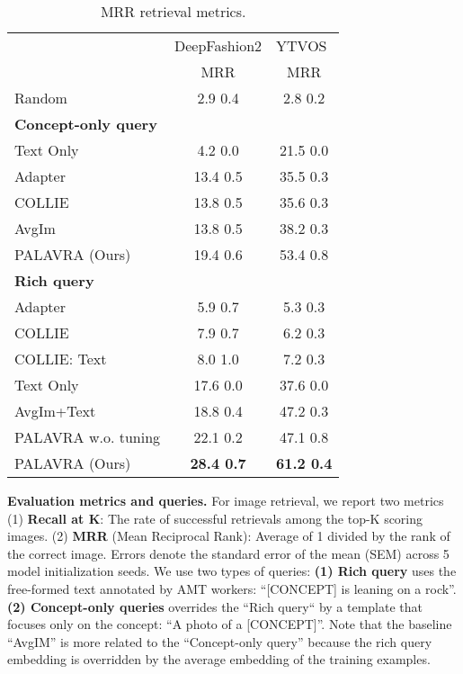 \documentclass[runningheads]{llncs}
\newcommand{\concept}{[CONCEPT]}
\begin{document}
\begin{table}[t]
\centering
    \begin{tabular}{l|c|c}

    \toprule
        {} &    \multicolumn{1}{l|}{DeepFashion2}       &    \multicolumn{1}{l}{YTVOS} \\
    {} &         MRR &         MRR \\
    \midrule
    Random         &   2.9  0.4 &   2.8  0.2 \\
    \toprule
    {\textbf{Concept-only query}} &&\\
    Text Only    &  4.2  0.0  &  21.5  0.0 \\
    Adapter        &  13.4  0.5 &  35.5  0.3 \\
    COLLIE         &  13.8  0.5 &  35.6  0.3 \\
    AvgIm          &  13.8  0.5 &  38.2  0.3 \\
    PALAVRA (Ours) &  19.4  0.6 &  53.4  0.8 \\    \toprule
    {\textbf{Rich query}}&&\\
    Adapter        &   5.9  0.7 &   5.3  0.3 \\
    COLLIE         &   7.9  0.7 &   6.2  0.3 \\
    COLLIE: Text    &  8.0  1.0 &   7.2  0.3 \\
    Text Only    &  17.6  0.0 &  37.6  0.0 \\
    AvgIm+Text     &  18.8  0.4 &  47.2  0.3 \\
    \midrule
    PALAVRA w.o. tuning   &  22.1  0.2 &  47.1  0.8 \\
    PALAVRA (Ours) &  \textbf{28.4  0.7} &  \textbf{61.2  0.4} \\
    \bottomrule
    
    \end{tabular}

    \caption{MRR retrieval metrics.}
    \label{table_main_retrieval}
\end{table}

\noindent\textbf{Evaluation metrics and queries.} For image retrieval, we report two metrics (1) \textbf{Recall at K}: The rate of successful retrievals among the top-K scoring images. (2) \textbf{MRR} (Mean Reciprocal Rank): Average of 1 divided by the rank of the correct image. Errors denote the standard error of the mean (SEM) across 5 model initialization seeds.
We use two types of queries: \textbf{(1) Rich query} uses the free-formed text annotated by AMT workers: ``\concept{} is leaning on a rock''. \textbf{(2) Concept-only queries} overrides the ``Rich query`` by a template that focuses only on the concept: ``A photo of a \concept{}''. Note that the baseline ``AvgIM''  is more related to the ``Concept-only query'' because the rich query embedding is overridden by the average embedding of the training examples.
\end{document}
